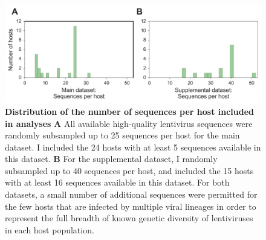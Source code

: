 \begin{figure}[ht!]
  \begin{centering}
    \includegraphics[width=.8\linewidth]{./png/siv_dataset_distrib.png}
  	\caption[Distribution of the number of sequences per host included in analyses]{\textbf{Distribution of the number of sequences per host included in analyses }
\textbf{A} All available high-quality lentivirus sequences were randomly subsampled up to 25 sequences per host for the main dataset.
I included the 24 hosts with at least 5 sequences available in this dataset.
\textbf{B} For the supplemental dataset, I randomly subsampled up to 40 sequences per host, and included the 15 hosts with at least 16 sequences available in this dataset.
For both datasets, a small number of additional sequences were permitted for the few hosts that are infected by multiple viral lineages in order to represent the full breadth of known genetic diversity of lentiviruses in each host population.
        }
  	\label{siv_dataset_distrib}
  \end{centering}
\end{figure}

